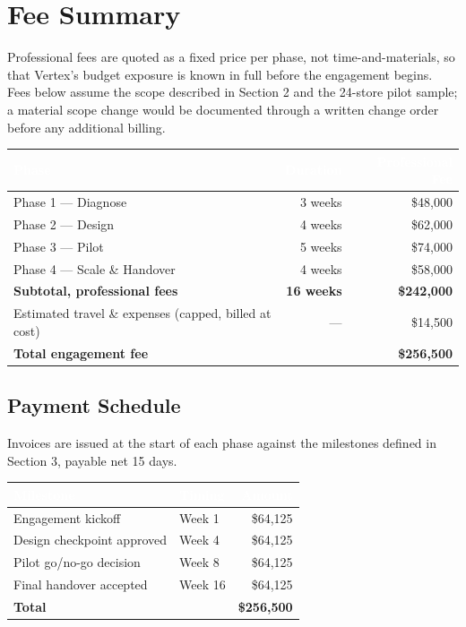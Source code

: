 \section{Fee Summary}

Professional fees are quoted as a fixed price per phase, not time-and-materials,
so that Vertex's budget exposure is known in full before the engagement
begins. Fees below assume the scope described in Section 2 and the 24-store
pilot sample; a material scope change would be documented through a written
change order before any additional billing.

\begin{center}
\begin{tabularx}{\textwidth}{@{}Xrr@{}}
\toprule
\rowcolor{primary}
\textcolor{white}{\bfseries Phase} & \textcolor{white}{\bfseries Duration} & \textcolor{white}{\bfseries Professional Fee} \\
\midrule
Phase 1 --- Diagnose & 3 weeks & \$48{,}000 \\
Phase 2 --- Design & 4 weeks & \$62{,}000 \\
Phase 3 --- Pilot & 5 weeks & \$74{,}000 \\
Phase 4 --- Scale \& Handover & 4 weeks & \$58{,}000 \\
\midrule
\rowcolor{lightbg}
\textbf{Subtotal, professional fees} & \textbf{16 weeks} & \textbf{\$242{,}000} \\
Estimated travel \& expenses (capped, billed at cost) & --- & \$14{,}500 \\
\midrule
\rowcolor{accentlight}
\textbf{Total engagement fee} & & \textbf{\$256{,}500} \\
\bottomrule
\end{tabularx}
\end{center}

\vspace{0.5cm}

\subsection{Payment Schedule}

Invoices are issued at the start of each phase against the milestones defined
in Section 3, payable net 15 days.

\begin{center}
\begin{tabularx}{\textwidth}{@{}Xlr@{}}
\toprule
\rowcolor{primary}
\textcolor{white}{\bfseries Milestone} & \textcolor{white}{\bfseries Timing} & \textcolor{white}{\bfseries Amount} \\
\midrule
Engagement kickoff & Week 1 & \$64{,}125 \\
Design checkpoint approved & Week 4 & \$64{,}125 \\
Pilot go/no-go decision & Week 8 & \$64{,}125 \\
Final handover accepted & Week 16 & \$64{,}125 \\
\midrule
\rowcolor{lightbg}
\textbf{Total} & & \textbf{\$256{,}500} \\
\bottomrule
\end{tabularx}
\end{center}

